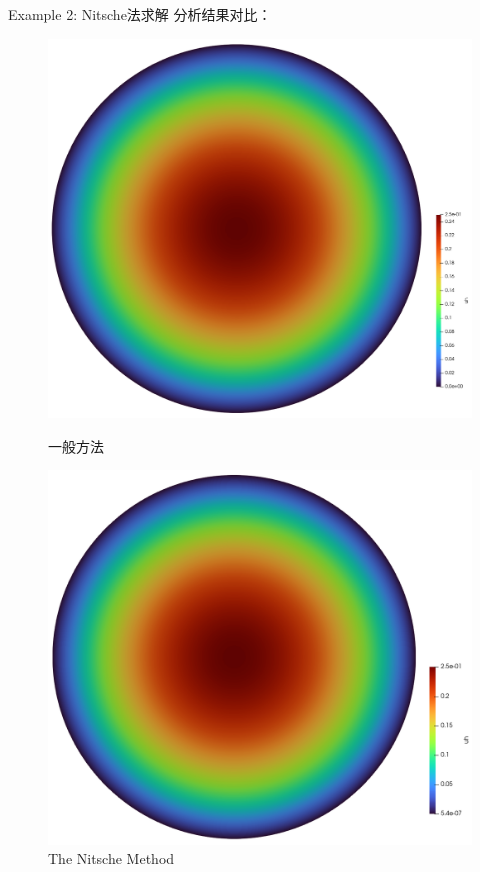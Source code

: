\documentclass[lang=en,aspectratio=43,theme=default,logo=on]{simplebeamer}
\begin{document}
\begin{frame}{Example 2: Nitsche法求解}
    分析结果对比：
    \begin{figure}
        \centering %
        \begin{minipage}[t]{0.5\linewidth}
            \centering
            \includegraphics[height=0.5\textheight]{./img/002.png}
            \caption{一般方法}
        \end{minipage}%
        \begin{minipage}[t]{0.5\linewidth}
            \centering
            \includegraphics[height=0.5\textheight]{./img/003.png}
            \caption{The Nitsche Method}
        \end{minipage}
    \end{figure}
\end{frame}
\end{document}
